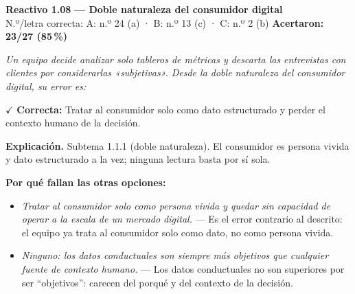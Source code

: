 \documentclass[10pt,letterpaper]{article}
\begin{document}
\begin{minipage}{\textwidth}
{\color{guinda}\textbf{Reactivo 1.08}} \textbf{— Doble naturaleza del consumidor digital}\\[-1pt]
{\scriptsize N.º/letra correcta: A: n.º 24 (a) · B: n.º 13 (c) · C: n.º 2 (b) \hfill \textbf{Acertaron: 23/27 (85\,\%)}}

\textit{Un equipo decide analizar solo tableros de métricas y descarta las entrevistas con clientes por considerarlas «subjetivas». Desde la doble naturaleza del consumidor digital, su error es:}

\textcolor{verde}{$\checkmark$} \textbf{Correcta:} Tratar al consumidor solo como dato estructurado y perder el contexto humano de la decisión.

\textbf{Explicación.} Subtema 1.1.1 (doble naturaleza). El consumidor es persona vivida y dato estructurado a la vez; ninguna lectura basta por sí sola.

\textbf{Por qué fallan las otras opciones:}
\begin{itemize}[itemsep=0pt,topsep=1pt,leftmargin=1.3em,parsep=0pt]
\item[\textcolor{rojo}{$\times$}] \textit{Tratar al consumidor solo como persona vivida y quedar sin capacidad de operar a la escala de un mercado digital.} --- Es el error contrario al descrito: el equipo ya trata al consumidor solo como dato, no como persona vivida.
\item[\textcolor{rojo}{$\times$}] \textit{Ninguno: los datos conductuales son siempre más objetivos que cualquier fuente de contexto humano.} --- Los datos conductuales no son superiores por ser ``objetivos'': carecen del porqué y del contexto de la decisión.
\end{itemize}
\end{minipage}\par\vspace{5pt}{\color{gray!40}\hrule}\vspace{5pt}
\end{document}
